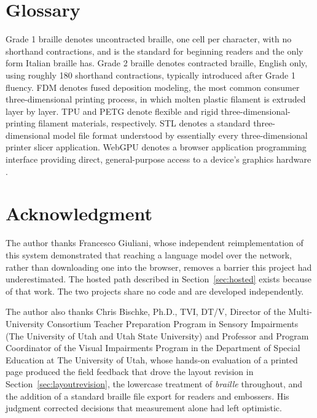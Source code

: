 \documentclass[conference]{IEEEtran}
\begin{document}
\section{Glossary}

Grade 1 braille denotes uncontracted braille, one cell per character, with no shorthand contractions, and is the standard for beginning readers and the only form Italian braille has. Grade 2 braille denotes contracted braille, English only, using roughly 180 shorthand contractions, typically introduced after Grade 1 fluency. FDM denotes fused deposition modeling, the most common consumer three-dimensional printing process, in which molten plastic filament is extruded layer by layer. TPU and PETG denote flexible and rigid three-dimensional-printing filament materials, respectively. STL denotes a standard three-dimensional model file format understood by essentially every three-dimensional printer slicer application. WebGPU denotes a browser application programming interface providing direct, general-purpose access to a device's graphics hardware \cite{w3cwebgpu}.

\section*{Acknowledgment}

The author thanks Francesco Giuliani, whose independent reimplementation of this system \cite{tattodev} demonstrated that reaching a language model over the network, rather than downloading one into the browser, removes a barrier this project had underestimated. The hosted path described in Section~\ref{sec:hosted} exists because of that work. The two projects share no code and are developed independently.

The author also thanks Chris Bischke, Ph.D., TVI, DT/V, Director of the Multi-University Consortium Teacher Preparation Program in Sensory Impairments (The University of Utah and Utah State University) and Professor and Program Coordinator of the Visual Impairments Program in the Department of Special Education at The University of Utah, whose hands-on evaluation of a printed page produced the field feedback that drove the layout revision in Section~\ref{sec:layoutrevision}, the lowercase treatment of \emph{braille} throughout, and the addition of a standard braille file export for readers and embossers. His judgment corrected decisions that measurement alone had left optimistic.
\end{document}
